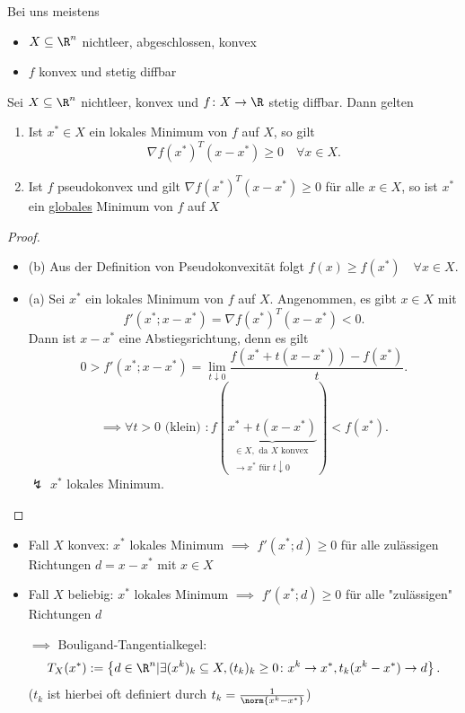 Bei uns meistens
\begin{itemize}
	\item $X \subseteq \R^{n}$ nichtleer, abgeschlossen, konvex
	\item $f$ konvex und stetig diffbar
\end{itemize}

\begin{satz}[Minimierungsprinzip]
\label{thm:minimierungsprinzip}
	Sei $X \subseteq \R^{n}$ nichtleer, konvex und $f \colon X \rightarrow \R $ stetig diffbar. Dann gelten
	\begin{enumerate}[label=(\alph{enumi})]
		\item Ist $x^{*}\in X$ ein lokales Minimum von $f$ auf $X$, so gilt
			\[
				\nabla f(x^{*})^{T}(x-x^{*}) \geq 0 \quad \forall x \in X
			.\] 
		\item Ist $f$ pseudokonvex und gilt $\nabla f(x^{*})^{T}(x-x^{*})\geq 0$ für alle $x \in X$, so ist $x^{*}$ ein \underline{globales} Minimum von $f$ auf $X$
	\end{enumerate}
\end{satz}

\begin{proof}
\label{thm:minimierungsprinzipbeweis}
\begin{itemize}
	\item (b) Aus der Definition von Pseudokonvexität folgt $f(x) \geq f(x^{*})\quad \forall x \in X$.
	\item (a) Sei $x^{*}$ ein lokales Minimum von $f$ auf $X$. Angenommen, es gibt $x \in X$ mit
		\[
			f'(x^{*}; x- x^{*}) = \nabla f(x^{*})^{T}(x-x^{*}) < 0
		.\] 
		Dann ist $x-x^{*}$ eine Abstiegsrichtung, denn es gilt
		\[
			0 > f'(x^{*};x-x^{*}) = \lim_{t \downarrow 0} \frac{f(x^{*} + t(x-x^{*}))-f(x^{*})}{t}
		.\] 
		\[
			\implies \forall t > 0 \text{ (klein) }: f(\underbrace{x^{*}+t(x-x^{*})}_{\substack{\in X, \text{ da $X$ konvex }\\ \rightarrow x^{*} \text{ für } t \downarrow 0}} ) < f(x^{*})
		.\] 
		$\lightning$ $x^{*}$ lokales Minimum.
\end{itemize}
\end{proof}

\begin{itemize}
	\item Fall $X$ konvex: $x^{*}$ lokales Minimum $\implies$ $f'(x^{*};d)\geq 0$ für alle zulässigen Richtungen $d=x-x^{*}$ mit $x \in X$
	\item Fall $X$ beliebig: $x^{*}$ lokales Minimum $\implies$ $f'(x^{*};d)\geq 0$ für alle "zulässigen" Richtungen $d$

		$\implies$ Bouligand-Tangentialkegel:
		\[
			T_{X}(x^{*}):= \left\{ d \in \R^{n} | \exists (x^{k})_{k} \subseteq X, (t_{k})_{k}\geq 0 \colon x^{k} \rightarrow x^{*}, t_{k}(x^{k}-x^{*}) \rightarrow d \right\} 
		.\] ($t_{k}$ ist hierbei oft definiert durch $t_{k}=\frac{1}{\norm{x^{k}- x^{*}} }$)
\end{itemize}

